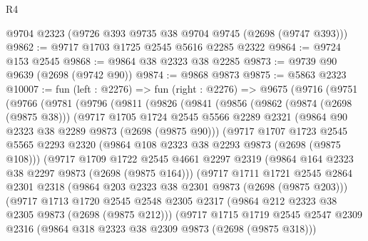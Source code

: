 \begin{lexlean}{R4}
\begin{coremodule}
    @9704
    @2323
    (@9726 @393 @9735 @38 @9704 @9745 (@2698 (@9747 @393)))
@9862 := @9717 @1703 @1725 @2545 @5616 @2285 @2322
@9864 := @9724 @153 @2545
@9868 := @9864 @38 @2323 @38 @2285
@9873 := @9739 @90 @9639 (@2698 (@9742 @90))
@9874 := @9868 @9873
@9875 := @5863 @2323
@10007 := fun (left : @2276) =>
  fun (right : @2276) =>
  @9675
    (@9716
      (@9751
        (@9766
          (@9781
            (@9796
              (@9811
                (@9826
                  (@9841
                    (@9856
                      (@9862
                        (@9874 (@2698 (@9875 @38)))
                        (@9717
                          @1705
                          @1724
                          @2545
                          @5566
                          @2289
                          @2321
                          (@9864 @90 @2323 @38 @2289 @9873 (@2698 (@9875 @90)))
                          (@9717
                            @1707
                            @1723
                            @2545
                            @5565
                            @2293
                            @2320
                            (@9864 @108 @2323 @38 @2293 @9873 (@2698 (@9875 @108)))
                            (@9717
                              @1709
                              @1722
                              @2545
                              @4661
                              @2297
                              @2319
                              (@9864 @164 @2323 @38 @2297 @9873 (@2698 (@9875 @164)))
                              (@9717
                                @1711
                                @1721
                                @2545
                                @2864
                                @2301
                                @2318
                                (@9864 @203 @2323 @38 @2301 @9873 (@2698 (@9875 @203)))
                                (@9717
                                  @1713
                                  @1720
                                  @2545
                                  @2548
                                  @2305
                                  @2317
                                  (@9864 @212 @2323 @38 @2305 @9873 (@2698 (@9875 @212)))
                                  (@9717
                                    @1715
                                    @1719
                                    @2545
                                    @2547
                                    @2309
                                    @2316
                                    (@9864 @318 @2323 @38 @2309 @9873 (@2698 (@9875 @318)))

\end{coremodule}
\end{lexlean}
